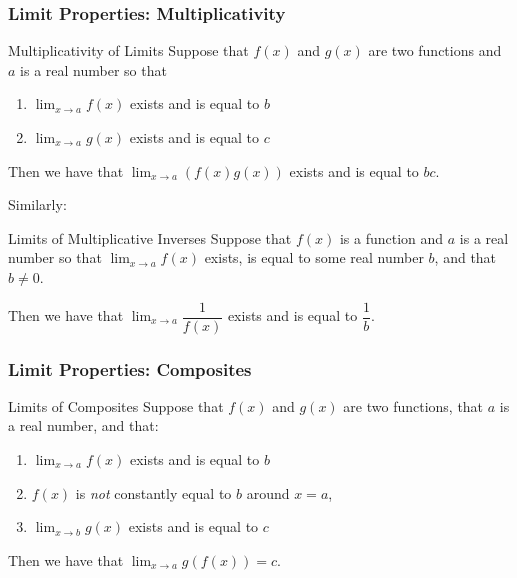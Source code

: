 \documentclass{ltx-talk}
\begin{document}
\begin{frame}
  \frametitle{Limit Properties: Multiplicativity}

  \begin{alertblock}{Multiplicativity of Limits}
    Suppose that $f(x)$ and $g(x)$ are two functions and $a$ is a real number so that \pause
    \begin{enumerate}
      \item $\lim_{x \rightarrow a} f(x)$ exists \pause and is equal to $b$ \pause
      \item $\lim_{x \rightarrow a} g(x)$ exists \pause and is equal to $c$ \pause
    \end{enumerate}

    Then we have that $\lim_{x \rightarrow a} (f(x)g(x))$ exists \pause and is equal to $bc$.
  \end{alertblock}

  Similarly: \pause

  \begin{alertblock}{Limits of Multiplicative Inverses} 
    Suppose that $f(x)$ is a function and $a$ is a real number so that \pause
    $\lim_{x \rightarrow a} f(x)$ exists, \pause is equal to some real number $b$, \pause
    and that $b \neq 0$.

    Then we have that $\lim_{x \rightarrow a} \dfrac{1}{f(x)}$ exists \pause and is equal to $\dfrac{1}{b}$.
  \end{alertblock}
\end{frame}

\begin{frame}
  \frametitle{Limit Properties: Composites}

  \begin{alertblock}{Limits of Composites}
    Suppose that $f(x)$ and $g(x)$ are two functions, that $a$ is a real number, and that:
    \begin{enumerate}
      \item $\lim_{x \rightarrow a} f(x)$ exists \pause and is equal to $b$ \pause
      \item $f(x)$ is \textit{not} constantly equal to $b$ around $x = a$, \pause
      \item $\lim_{x \rightarrow b} g(x)$ exists \pause and is equal to $c$ \pause
    \end{enumerate}

    Then we have that $\lim_{x \rightarrow a} g(f(x)) = c$.
  \end{alertblock}
\end{frame}
\end{document}
